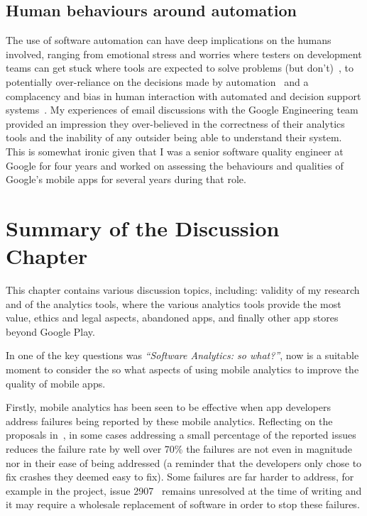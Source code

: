 \subsection{Human behaviours around automation}
The use of software automation can have deep implications on the humans involved, ranging from emotional stress and worries where testers on development teams can get stuck where tools are expected to solve problems (but don't)~\cite{evans2020stuck}, to potentially over-reliance on the decisions made by automation~\cite{cummings2004automation} and a complacency and bias in human interaction with automated and decision support systems~\cite{parasuraman_complacency_and_bias_in_human_use_of_automation}. 
My experiences of email discussions with the Google Engineering team provided an impression they over-believed in the correctness of their analytics tools and the inability of any outsider 
being able to understand their system. This is somewhat ironic given that I was a senior software quality engineer at Google for four years and worked on assessing the behaviours and qualities of Google's mobile apps for several years during that role.



\section{Summary of the Discussion Chapter}


This chapter contains various discussion topics, including: validity of my research and of the analytics tools, where the various analytics tools provide the most value, ethics and legal aspects, abandoned apps, and finally other app stores beyond Google Play.

In  one of the key questions was \emph{``Software Analytics: so what?''}, now is a suitable moment to consider the so what aspects of using mobile analytics to improve the quality of mobile apps. 

Firstly, mobile analytics has been seen to be effective when app developers address failures being reported by these mobile analytics. Reflecting on the proposals in~, in some cases addressing a small percentage of the reported issues reduces the failure rate by well over 70\% the failures are not even in magnitude nor in their ease of being addressed (a reminder that the  developers only chose to fix crashes they deemed easy to fix). Some failures are far harder to address, for example in the  project, issue 2907~ remains unresolved at the time of writing and it may require a wholesale replacement of software in order to stop these failures.




